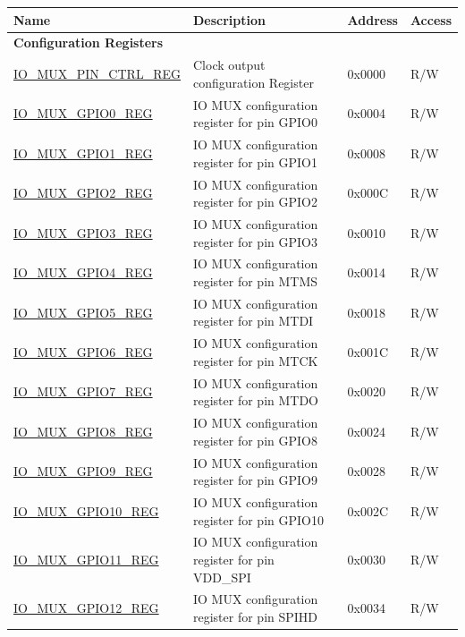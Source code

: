 \begin{longtable}{ | p{6cm} | p{7.2cm} | p{1.3cm} | p{1cm} | }
\hline\rowcolor{lightgray}
Name & Description &  Address & Access \\ \hline
\endhead
\multicolumn{4}{|l|}{\textbf{Configuration Registers}} \\ \hline
\hyperref[regdesc:IOMUXPINCTRLREG]{IO\_MUX\_PIN\_CTRL\_REG} & Clock output configuration Register & 0x0000 & R/W \\ \hline
\hyperref[regdesc:IOMUXGPIONREG]{IO\_MUX\_GPIO0\_REG} & IO MUX configuration register for pin GPIO0 & 0x0004 & R/W \\ \hline
\hyperref[regdesc:IOMUXGPIONREG]{IO\_MUX\_GPIO1\_REG} & IO MUX configuration register for pin GPIO1 & 0x0008 & R/W \\ \hline
\hyperref[regdesc:IOMUXGPIONREG]{IO\_MUX\_GPIO2\_REG} & IO MUX configuration register for pin GPIO2 & 0x000C & R/W \\ \hline
\hyperref[regdesc:IOMUXGPIONREG]{IO\_MUX\_GPIO3\_REG} & IO MUX configuration register for pin GPIO3 & 0x0010 & R/W \\ \hline
\hyperref[regdesc:IOMUXGPIONREG]{IO\_MUX\_GPIO4\_REG} & IO MUX configuration register for pin MTMS& 0x0014 & R/W \\ \hline
\hyperref[regdesc:IOMUXGPIONREG]{IO\_MUX\_GPIO5\_REG} & IO MUX configuration register for pin MTDI & 0x0018 & R/W \\ \hline
\hyperref[regdesc:IOMUXGPIONREG]{IO\_MUX\_GPIO6\_REG} & IO MUX configuration register for pin MTCK & 0x001C & R/W \\ \hline
\hyperref[regdesc:IOMUXGPIONREG]{IO\_MUX\_GPIO7\_REG} & IO MUX configuration register for pin MTDO & 0x0020 & R/W \\ \hline
\hyperref[regdesc:IOMUXGPIONREG]{IO\_MUX\_GPIO8\_REG} & IO MUX configuration register for pin GPIO8 & 0x0024 & R/W \\ \hline
\hyperref[regdesc:IOMUXGPIONREG]{IO\_MUX\_GPIO9\_REG} & IO MUX configuration register for pin GPIO9 & 0x0028 & R/W \\ \hline
\hyperref[regdesc:IOMUXGPIONREG]{IO\_MUX\_GPIO10\_REG} & IO MUX configuration register for pin GPIO10 & 0x002C & R/W \\ \hline
\hyperref[regdesc:IOMUXGPIONREG]{IO\_MUX\_GPIO11\_REG} & IO MUX configuration register for pin VDD\_SPI & 0x0030 & R/W \\ \hline
\hyperref[regdesc:IOMUXGPIONREG]{IO\_MUX\_GPIO12\_REG} & IO MUX configuration register for pin SPIHD & 0x0034 & R/W \\ \hline

\end{longtable}
